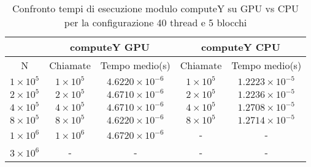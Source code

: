 \begin{table}[ht!]
    \begin{center}
        \renewcommand{\arraystretch}{1.5}
        \begin{adjustbox}{width=.65\textwidth}
            \begin{tabular}{ |c|c|c|c|c| }
                \hline
                \multicolumn{1}{|c}{} & \multicolumn{2}{|c}{computeY GPU} & \multicolumn{2}{|c|}{computeY CPU} \\
                \hline
                N & Chiamate & Tempo medio(s) & Chiamate & Tempo medio(s) \\
                \hline 
                $1 \times 10^5$ & $1 \times 10^{5}$ & $4.6220 \times 10^{-6}$ & $1 \times 10^{5}$ & $1.2223 \times 10^{-5}$ \\ 
                \hline 
                $2 \times 10^5$ & $2 \times 10^{5}$ & $4.6710 \times 10^{-6}$ & $2 \times 10^{5}$ & $1.2236 \times 10^{-5}$ \\ 
                \hline 
                $4 \times 10^5$ & $4 \times 10^{5}$ & $4.6710 \times 10^{-6}$ & $4 \times 10^{5}$ & $1.2708 \times 10^{-5}$ \\ 
                \hline
                $8 \times 10^5$ & $8 \times 10^{5}$ & $4.6220 \times 10^{-6}$ & $8 \times 10^{5}$ & $1.2714 \times 10^{-5}$ \\ 
                \hline 
                $1 \times 10^6$ & $1 \times 10^{6}$ & $4.6720 \times 10^{-6}$ & - & - \\ 
                \hline 
                $3 \times 10^6$ & - & - & - & - \\ 
                \hline 
            \end{tabular}
        \end{adjustbox}
    \end{center}
    \caption{Confronto tempi di esecuzione modulo computeY su GPU vs CPU per la configurazione 40 thread e 5 blocchi}
    \label{tab:computeY_kernel_table_40x5}
\end{table}

